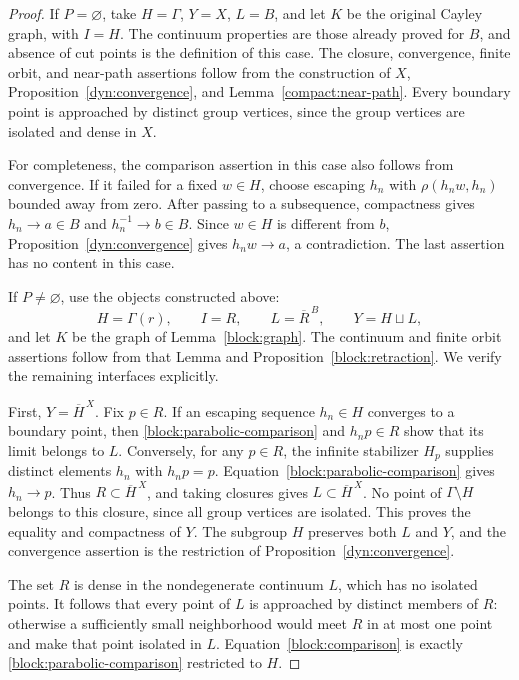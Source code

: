 \begin{proof}
If $P=\varnothing$, take $H=\Gamma$, $Y=X$, $L=B$, and let $K$ be the
original Cayley graph, with $I=H$.  The continuum properties are those
already proved for $B$, and absence of cut points is the definition of
this case.  The closure, convergence, finite orbit, and near-path
assertions follow from the construction of $X$,
Proposition~\ref{dyn:convergence}, and
Lemma~\ref{compact:near-path}.  Every boundary point is approached by
distinct group vertices, since the group vertices are isolated and
dense in $X$.

For completeness, the comparison assertion in this case also follows
from convergence.  If it failed for a fixed $w\in H$, choose escaping
$h_n$ with $\rho(h_nw,h_n)$ bounded away from zero.  After passing to a
subsequence, compactness gives $h_n\to a\in B$ and
$h_n^{-1}\to b\in B$.  Since $w\in H$ is different from $b$,
Proposition~\ref{dyn:convergence} gives $h_nw\to a$, a contradiction.
The last assertion has no content in this case.

If $P\ne\varnothing$, use the objects constructed above:
\[
  H=\Gamma(r),\qquad I=R,\qquad
  L=\overline R^{\,B},\qquad Y=H\sqcup L,
\]
and let $K$ be the graph of Lemma~\ref{block:graph}.
The continuum and finite orbit assertions follow from that Lemma and
Proposition~\ref{block:retraction}.  We verify the remaining
interfaces explicitly.

First, $Y=\overline H^{\,X}$.  Fix $p\in R$.  If an escaping sequence
$h_n\in H$ converges to a boundary point, then
\eqref{block:parabolic-comparison} and $h_np\in R$ show that its limit
belongs to $L$.  Conversely, for any $p\in R$, the infinite stabilizer
$H_p$ supplies distinct elements $h_n$ with $h_np=p$.
Equation~\eqref{block:parabolic-comparison} gives $h_n\to p$.  Thus
$R\subset\overline H^{\,X}$, and taking closures gives
$L\subset\overline H^{\,X}$.  No point of $\Gamma\setminus H$ belongs
to this closure, since all group vertices are isolated.  This proves
the equality and compactness of $Y$.  The subgroup $H$ preserves both
$L$ and $Y$, and the convergence assertion is the restriction of
Proposition~\ref{dyn:convergence}.

The set $R$ is dense in the nondegenerate continuum $L$, which has no
isolated points.  It follows that every point of $L$ is approached by
distinct members of $R$: otherwise a sufficiently small neighborhood
would meet $R$ in at most one point and make that point isolated in
$L$.  Equation~\eqref{block:comparison} is exactly
\eqref{block:parabolic-comparison} restricted to $H$.


\end{proof}
